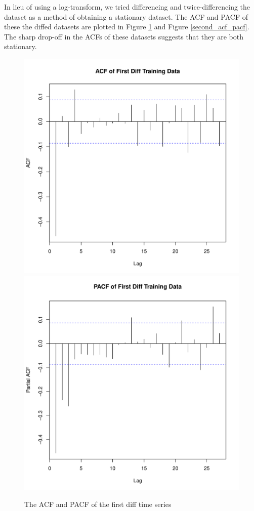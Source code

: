 \documentclass[11pt]{paper}
\begin{document}
In lieu of using a log-transform, we tried differencing and twice-differencing the dataset as a method of obtaining a stationary dataset. The ACF and PACF of these the diffed datasets are plotted in Figure \ref{first_acf_pacf} and Figure \ref{second_acf_pacf}. The sharp drop-off in the ACFs of these datasets suggests that they are both stationary.

\begin{figure}
\centering
\includegraphics[width=0.45\linewidth]{../image/acf_first_diff.pdf}
\includegraphics[width=0.45\linewidth]{../image/pacf_first_diff.pdf}
\caption{The ACF and PACF of the first diff time series}
\label{first_acf_pacf}
\end{figure}
\end{document}
